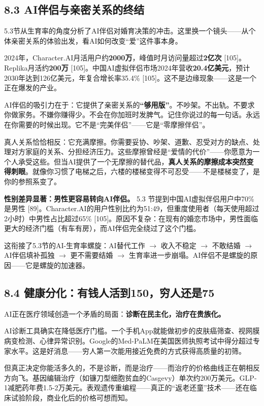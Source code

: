 \documentclass[11pt,a4paper]{ctexart}
\begin{document}
\subsection{8.3 AI伴侣与亲密关系的终结}

5.3节从生育率的角度分析了AI伴侣对婚育决策的冲击。这里换一个镜头——从个体亲密关系的体验出发，看AI如何改变“爱”这件事本身。

2024年，Character.AI月活用户约\textbf{2000万}，峰值时月访问量超过\textbf{2亿次}{} [105]。Replika月活约\textbf{200万}{} [105]。中国AI虚拟伴侣市场2024年营收\textbf{20.4亿美元}，预计2030年达到126亿美元，年复合增长率35.4\% [105]。这不是边缘现象——这是一个正在爆发的产业。

AI伴侣的吸引力在于：它提供了亲密关系的\textbf{“够用版”}。不吵架。不出轨。不要求你做家务。不嫌你赚得少。不会在你加班时发脾气。记住你说过的每一句话。永远在你需要的时候出现。它不是“完美伴侣”——它是“零摩擦伴侣”。

真人关系恰恰相反：它充满摩擦。你需要妥协、吵架、道歉、忍受对方的缺点、处理对方家庭的关系、分担经济压力。这些摩擦曾经是“爱情的代价”——你愿意为一个人承受这些。但当AI提供了一个无摩擦的替代品，\textbf{真人关系的摩擦成本突然变得刺眼}。就像你习惯了电梯之后，六楼的楼梯变得不可忍受——不是楼梯变了，是你的参照系变了。

\textbf{性别差异显著：男性更容易转向AI伴侣。} 5.3 节提到中国AI虚拟伴侣用户中70\%是男性 [89]。Character.AI的用户性别比约为51:49，但重度使用者（每天使用超过2小时）中男性占比超过65\% [105]。原因不复杂：在现有的婚恋市场中，男性面临更大的经济门槛（有车有房），而AI伴侣完全绕过了这个门槛。

这衔接了5.3节的AI-生育率螺旋：AI替代工作 $\to$ 收入不稳定 $\to$ 不敢结婚 $\to$ AI伴侣填补孤独 $\to$ 更不需要结婚 $\to$ 生育率进一步崩塌。AI伴侣不是螺旋的原因——它是螺旋的加速器。

\subsection{8.4 健康分化：有钱人活到150，穷人还是75}

AI正在医疗领域创造一个矛盾的局面：\textbf{诊断在民主化，治疗在贵族化。}

AI诊断工具确实在降低医疗门槛。一个手机App就能做初步的皮肤癌筛查、视网膜病变检测、心律异常识别。Google的Med-PaLM在美国医师执照考试中得分超过专家水平。这是好消息——穷人第一次能用接近免费的方式获得高质量的初筛。

但真正决定你能活多久的，不是诊断，而是治疗——而治疗的价格曲线正在朝相反方向飞。基因编辑治疗（如镰刀型细胞贫血的Casgevy）单次约200万美元。GLP-1减肥药年费1.5-2万美元。表观遗传重编程——真正的“返老还童”技术——还在临床试验阶段，商业化后的价格可想而知。
\end{document}
